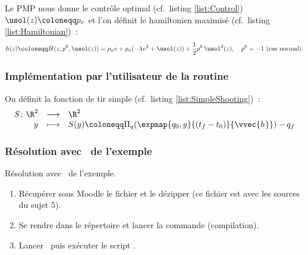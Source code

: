 Le PMP nous donne le contr\^ole optimal (cf.\ listing \ref{list:Control})
$\usol(z) \coloneqq p_v$
et l'on d\'efinit le hamiltonien maximis\'e (cf.\ listing \ref{list:Hamiltonian})~:
\begin{equation*}
    h(z) \coloneqq H(z,p^0,\usol(z)) = p_{x} v + p_{v} (-\lambda v^2 + \usol(z)) + \frac{1}{2} p^0\, \usol^2(z), \quad p^0 = -1 \text{ (cas normal).}
\end{equation*}





\subsubsection{Impl\'ementation par l'utilisateur de la routine \fortran\ }
On d\'efinit la fonction de tir simple (cf.\ listing \ref{list:SimpleShooting})~:
\begin{equation*}
    \begin{array}{rcl}
        S \colon \R^2 & \longrightarrow   & \R^2 \\
        y                       & \longmapsto       & \displaystyle S(y) \coloneqq \Pi_{q}( \expmap{q_0,y}{(t_f-t_0)}{\vvec{h}} ) - q_{f}
    \end{array}
\end{equation*}



\subsubsection{R\'esolution avec \hampath\ de l'exemple}

\begin{myExercice} R\'esolution avec \hampath\ de l'exemple.
\begin{enumerate}
    \item R\'ecup\'erer sous Moodle le fichier  et le d\'ezipper (ce fichier est avec les sources du sujet 5).
    \item Se rendre dans le r\'epertoire  et lancer la commande  (compilation).
    \item Lancer \matlab\ puis ex\'ecuter le script .
\end{enumerate}
\end{myExercice}

